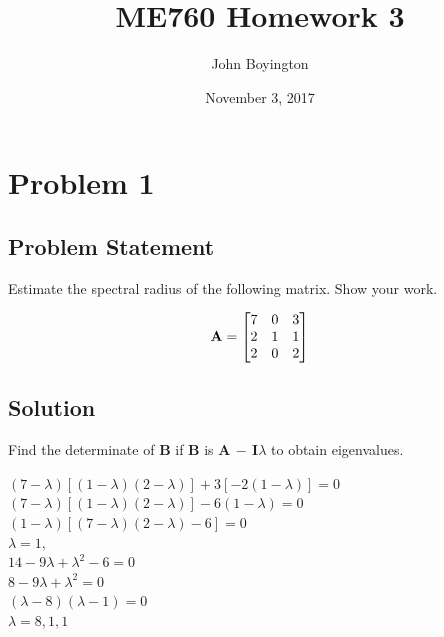 \documentclass{article}
\title{ME760 Homework 3}
\author{John Boyington}
\date{November 3, 2017}
\begin{document}
    \maketitle
    
    
    \section*{Problem 1}
    \subsection*{Problem Statement}
    Estimate the spectral radius of the following matrix. Show your work.
    
        \[{\bf A} =\begin{bmatrix}
    		7&0&3\\
    		2&1&1\\
    		2&0&2\\
    	\end{bmatrix}\]
    
    \subsection*{Solution}
    Find the determinate of {\bf B} if {\bf B} is {\bf A $-$ I$\lambda$} to obtain eigenvalues. \\
    
    \begin{centering}
    
    $(7 - \lambda)[(1 - \lambda)(2 - \lambda)] + 3[-2(1 - \lambda)] = 0$ \\
    
    $(7 - \lambda)[(1 - \lambda)(2 - \lambda)]  -6(1 - \lambda) = 0$ \\
    
    $(1 - \lambda)[(7 - \lambda)(2 - \lambda) - 6] = 0$ \\
    
    $\lambda = 1,$ \\
    
    $14 - 9\lambda + \lambda^{2} - 6 = 0$ \\
    
    $8 - 9\lambda + \lambda^{2} = 0$ \\
    
    $(\lambda - 8)(\lambda - 1) = 0$ \\
    
    $\lambda = 8, 1, 1$ \\
    
    \end{centering}
    
\end{document}

